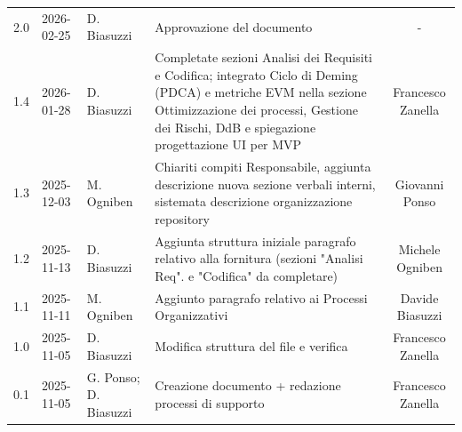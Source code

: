 \documentclass[a4paper, 11pt, oneside]{scrartcl}
\begin{document}
\begin{center}
{\begin{tabular}{@{}llp{}p{}c@{}}
            2.0               & 2026-02-25    & D. Biasuzzi           & Approvazione del documento                                                                                                                                                                                      & -                       \\
            1.4               & 2026-01-28    & D. Biasuzzi           & Completate sezioni Analisi dei Requisiti e Codifica; integrato Ciclo di Deming (PDCA) e metriche EVM nella sezione Ottimizzazione dei processi, Gestione dei Rischi, DdB e spiegazione progettazione UI per MVP & Francesco Zanella       \\
            1.3               & 2025-12-03    & M. Ogniben            & Chiariti compiti Responsabile, aggiunta descrizione nuova sezione verbali interni, sistemata descrizione organizzazione repository                                                                              & Giovanni Ponso          \\
            1.2               & 2025-11-13    & D. Biasuzzi           & Aggiunta struttura iniziale paragrafo relativo alla fornitura (sezioni "Analisi Req". e "Codifica" da completare)                                                                                               & Michele Ogniben         \\
            1.1               & 2025-11-11    & M. Ogniben            & Aggiunto paragrafo relativo ai Processi Organizzativi                                                                                                                                                           & Davide Biasuzzi         \\
            1.0               & 2025-11-05    & D. Biasuzzi           & Modifica struttura del file e verifica                                                                                                                                                                          & Francesco Zanella       \\
            0.1               & 2025-11-05    & G. Ponso; D. Biasuzzi & Creazione documento + redazione processi di supporto                                                                                                                                                            & Francesco Zanella       \\
            \bottomrule
        \end{tabular}
    }
\end{center}
\end{document}
